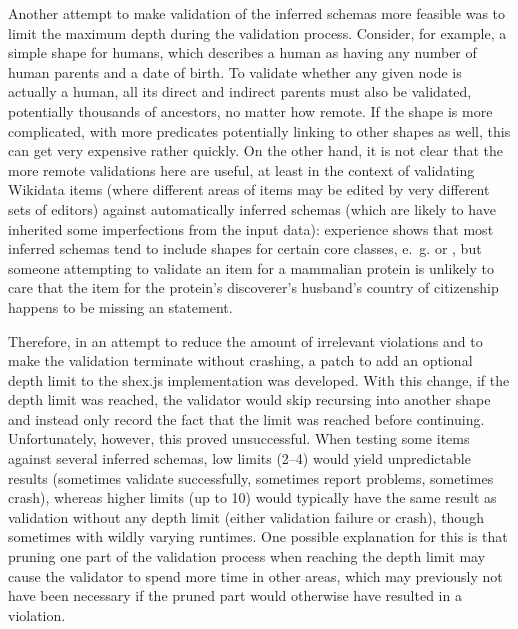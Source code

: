 Another attempt to make validation of the inferred schemas more feasible
was to limit the maximum depth during the validation process. %
Consider, for example, a simple shape for humans, %
which describes a human as having any number of human parents and a date of birth.
To validate whether any given node is actually a human,
all its direct and indirect parents must also be validated,
potentially thousands of ancestors, no matter how remote.
If the shape is more complicated,
with more predicates potentially linking to other shapes as well,
this can get very expensive rather quickly.
On the other hand, it is not clear that the more remote validations here are useful,
at least in the context of validating Wikidata items
(where different areas of items may be edited by very different sets of editors)
against automatically inferred schemas
(which are likely to have inherited some imperfections from the input data): %
experience shows that %
most inferred schemas tend to include shapes for certain core classes,
e.~g.  or ,
but someone attempting to validate an item for a mammalian protein
is unlikely to care that the item for the protein’s discoverer’s husband’s country of citizenship %
happens to be missing an  statement.

Therefore, %
in an attempt to reduce the amount of irrelevant violations
and to make the validation terminate without crashing,
a patch to add an optional depth limit to the shex.js implementation was developed.
With this change, if the depth limit was reached,
the validator would skip recursing into another shape
and instead only record the fact that the limit was reached before continuing.
Unfortunately, however, this proved unsuccessful.
When testing some items against several inferred schemas,
low limits (2–4) would yield unpredictable results
(sometimes validate successfully, sometimes report problems, sometimes crash),
whereas higher limits (up to 10) would typically have the same result as validation without any depth limit
(either validation failure or crash),
though sometimes with wildly varying runtimes. %
One possible explanation for this is that pruning one part of the validation process when reaching the depth limit
may cause the validator to spend more time in other areas,
which may previously not have been necessary if the pruned part would otherwise have resulted in a violation.

